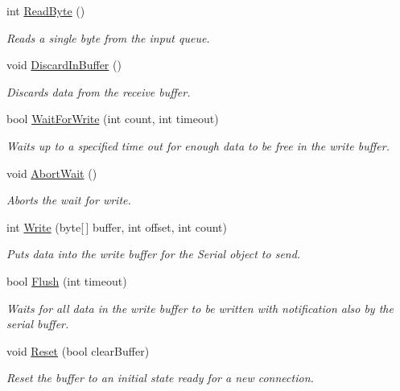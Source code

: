 \begin{DoxyCompactItemize}
int \mbox{\hyperlink{interface_r_j_c_p_1_1_i_o_1_1_ports_1_1_native_1_1_i_serial_buffer_stream_data_a26b358983643725cee8c161ac6abf912}{Read\+Byte}} ()
\begin{DoxyCompactList}\small\item\em Reads a single byte from the input queue. \end{DoxyCompactList}\item 
void \mbox{\hyperlink{interface_r_j_c_p_1_1_i_o_1_1_ports_1_1_native_1_1_i_serial_buffer_stream_data_a44d3fd5155c163b756712432cb4df387}{Discard\+In\+Buffer}} ()
\begin{DoxyCompactList}\small\item\em Discards data from the receive buffer. \end{DoxyCompactList}\item 
bool \mbox{\hyperlink{interface_r_j_c_p_1_1_i_o_1_1_ports_1_1_native_1_1_i_serial_buffer_stream_data_ae8b9e26ea5a73cedf4314708b8e12c0d}{Wait\+For\+Write}} (int count, int timeout)
\begin{DoxyCompactList}\small\item\em Waits up to a specified time out for enough data to be free in the write buffer. \end{DoxyCompactList}\item 
void \mbox{\hyperlink{interface_r_j_c_p_1_1_i_o_1_1_ports_1_1_native_1_1_i_serial_buffer_stream_data_a3441575dd01e2111a5a66c593822f3f6}{Abort\+Wait}} ()
\begin{DoxyCompactList}\small\item\em Aborts the wait for write. \end{DoxyCompactList}\item 
int \mbox{\hyperlink{interface_r_j_c_p_1_1_i_o_1_1_ports_1_1_native_1_1_i_serial_buffer_stream_data_a9499ef9e6a11233aa5f3855bff6c69b0}{Write}} (byte\mbox{[}$\,$\mbox{]} buffer, int offset, int count)
\begin{DoxyCompactList}\small\item\em Puts data into the write buffer for the Serial object to send. \end{DoxyCompactList}\item 
bool \mbox{\hyperlink{interface_r_j_c_p_1_1_i_o_1_1_ports_1_1_native_1_1_i_serial_buffer_stream_data_a7013d68f281c1007dac3ed592b29510f}{Flush}} (int timeout)
\begin{DoxyCompactList}\small\item\em Waits for all data in the write buffer to be written with notification also by the serial buffer. \end{DoxyCompactList}\item 
void \mbox{\hyperlink{interface_r_j_c_p_1_1_i_o_1_1_ports_1_1_native_1_1_i_serial_buffer_stream_data_afbf7fddda140259c624de77a936eee28}{Reset}} (bool clear\+Buffer)
\begin{DoxyCompactList}\small\item\em Reset the buffer to an initial state ready for a new connection. \end{DoxyCompactList}\end{DoxyCompactItemize}
